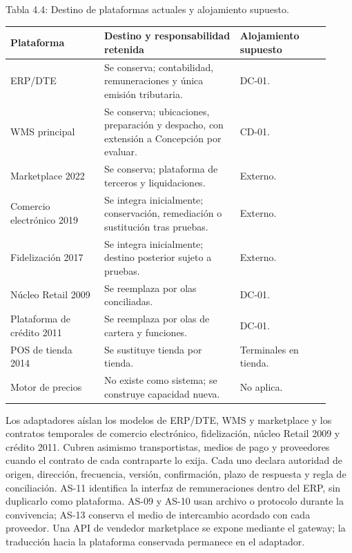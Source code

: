 \documentclass[11pt]{article}
\begin{document}
Tabla 4.4: Destino de plataformas actuales y alojamiento supuesto.\par\nopagebreak
\begin{longtable}{@{}p{0.27\linewidth}p{0.39\linewidth}p{0.26\linewidth}@{}}
\toprule Plataforma & Destino y responsabilidad retenida & Alojamiento supuesto \\
\midrule\endhead\bottomrule\endlastfoot
ERP/DTE & Se conserva; contabilidad, remuneraciones y única emisión tributaria. & DC-01. \\
WMS principal & Se conserva; ubicaciones, preparación y despacho, con extensión a Concepción por evaluar. & CD-01. \\
Marketplace 2022 & Se conserva; plataforma de terceros y liquidaciones. & Externo. \\
Comercio electrónico 2019 & Se integra inicialmente; conservación, remediación o sustitución tras pruebas. & Externo. \\
Fidelización 2017 & Se integra inicialmente; destino posterior sujeto a pruebas. & Externo. \\
Núcleo Retail 2009 & Se reemplaza por olas conciliadas. & DC-01. \\
Plataforma de crédito 2011 & Se reemplaza por olas de cartera y funciones. & DC-01. \\
POS de tienda 2014 & Se sustituye tienda por tienda. & Terminales en tienda. \\
Motor de precios & No existe como sistema; se construye capacidad nueva. & No aplica. \\
\end{longtable}

Los adaptadores aíslan los modelos de ERP/DTE, WMS y marketplace y los contratos temporales de comercio electrónico, fidelización, núcleo Retail 2009 y crédito 2011. Cubren asimismo transportistas, medios de pago y proveedores cuando el contrato de cada contraparte lo exija. Cada uno declara autoridad de origen, dirección, frecuencia, versión, confirmación, plazo de respuesta y regla de conciliación. AS-11 identifica la interfaz de remuneraciones dentro del ERP, sin duplicarlo como plataforma. AS-09 y AS-10 usan archivo o protocolo durante la convivencia; AS-13 conserva el medio de intercambio acordado con cada proveedor. Una API de vendedor marketplace se expone mediante el gateway; la traducción hacia la plataforma conservada permanece en el adaptador.
\end{document}
